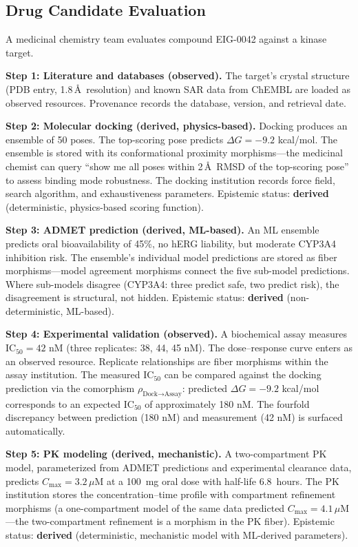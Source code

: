 \documentclass[10pt,twocolumn,letterpaper]{article}
\begin{document}
\subsection{Drug Candidate Evaluation}

A medicinal chemistry team evaluates compound EIG-0042 against a kinase target.

\textbf{Step 1: Literature and databases (observed).}
The target's crystal structure (PDB entry, 1.8\,\AA\ resolution) and known SAR data from ChEMBL are loaded as observed resources. Provenance records the database, version, and retrieval date.

\textbf{Step 2: Molecular docking (derived, physics-based).}
Docking produces an ensemble of 50 poses. The top-scoring pose predicts $\Delta G = -9.2$ kcal/mol. The ensemble is stored with its conformational proximity morphisms---the medicinal chemist can query ``show me all poses within 2\,\AA\ RMSD of the top-scoring pose'' to assess binding mode robustness. The docking institution records force field, search algorithm, and exhaustiveness parameters. Epistemic status: \textbf{derived} (deterministic, physics-based scoring function).

\textbf{Step 3: ADMET prediction (derived, ML-based).}
An ML ensemble predicts oral bioavailability of 45\%, no hERG liability, but moderate CYP3A4 inhibition risk. The ensemble's individual model predictions are stored as fiber morphisms---model agreement morphisms connect the five sub-model predictions. Where sub-models disagree (CYP3A4: three predict safe, two predict risk), the disagreement is structural, not hidden. Epistemic status: \textbf{derived} (non-deterministic, ML-based).

\textbf{Step 4: Experimental validation (observed).}
A biochemical assay measures IC$_{50} = 42$ nM (three replicates: 38, 44, 45 nM). The dose--response curve enters as an observed resource. Replicate relationships are fiber morphisms within the assay institution. The measured IC$_{50}$ can be compared against the docking prediction via the comorphism $\rho_{\text{Dock} \to \text{Assay}}$: predicted $\Delta G = -9.2$ kcal/mol corresponds to an expected IC$_{50}$ of approximately 180 nM. The fourfold discrepancy between prediction (180 nM) and measurement (42 nM) is surfaced automatically.

\textbf{Step 5: PK modeling (derived, mechanistic).}
A two-compartment PK model, parameterized from ADMET predictions and experimental clearance data, predicts $C_{\max} = 3.2\,\mu$M at a 100~mg oral dose with half-life 6.8~hours. The PK institution stores the concentration--time profile with compartment refinement morphisms (a one-compartment model of the same data predicted $C_{\max} = 4.1\,\mu$M---the two-compartment refinement is a morphism in the PK fiber). Epistemic status: \textbf{derived} (deterministic, mechanistic model with ML-derived parameters).
\end{document}
